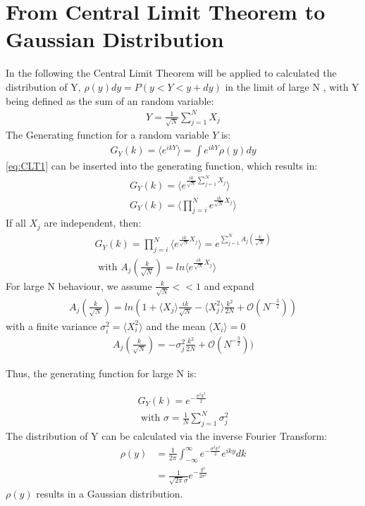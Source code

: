 \documentclass[
  a4paper,BCOR10mm,oneside,
  bibtotoc,idxtotoc,
  headsepline,footsepline,%
  fleqn,openbib
]{scrbook}
\begin{document}
\section{From Central Limit Theorem to Gaussian Distribution}\label{append:CLT}
In the following the Central Limit Theorem will be applied to calculated the distribution of Y,  $\rho(y)dy=P(y<Y<y+dy)$ in the limit of large N , with Y being defined as the sum of an random variable:
 \begin{align}
  Y = \frac{1}{\sqrt{N}} \sum_{j=1}^N X_j \label{eq:CLT1}
 \end{align}
The Generating function for a random variable $Y$ is: 
\begin{align}
 G_Y(k)=\langle e^{ikY}\rangle = \int e^{ikY} \rho(y)dy
\end{align}
\cref{eq:CLT1} can be inserted into the generating function, which results in:
\begin{align*}
G_Y(k)=\langle e^{\frac{ik}{\sqrt{N}} \sum_{j=1}^N X_j}\rangle \\
G_Y(k)=\langle \prod_{j=i}^N e^{\frac{ik}{\sqrt{N}} X_j} \rangle 
\end{align*}
If all $X_j$ are independent, then:
\begin{align}
 G_Y(k)= \prod_{j=i}^N \langle e^{\frac{ik}{\sqrt{N}} X_j} \rangle =e^{\sum_{j=1}^N A_j (\frac{k}{\sqrt{N}})} \\ \nonumber \text{ with } A_j(\frac{k}{\sqrt{N}})= ln \langle e^{\frac{ik}{\sqrt{N}} X_j} \rangle 
\end{align}
For large N behaviour, we assume $\frac{k}{\sqrt{N}} << 1$ and expand
\begin{align}
 A_j(\frac{k}{\sqrt{N}}) = ln(1+ \langle X_j \rangle \frac{ik}{\sqrt{N}} - \langle X_{j}^2 \rangle \frac{k^2}{2N}+\mathcal{O}(N^{- \frac{3}{2}}))
\end{align}
 with a finite variance $ \sigma_i^2=\langle X_{i}^2\rangle $ and the mean $\langle X_{i}\rangle = 0$
\begin{align}
 A_j(\frac{k}{\sqrt{N}}) = -\sigma_j^2 \frac{k^2}{2N}+\mathcal{O}(N^{- \frac{3}{2}}))
\end{align}

Thus, the generating function for large N is:

\begin{align}
 G_Y(k)=e^{- \frac{\sigma^2 k^2}{2}} \\ \nonumber
 \text{ with } \sigma =  \frac{1}{N} \sum_{j=1}^N \sigma_j^2 
\end{align}
The distribution of Y can be calculated via the inverse Fourier Transform:
\begin{align}
 \rho(y) &=\frac{1}{2 \pi} \int_{-\infty}^{\infty} e^{- \frac{\sigma^2 k^2}{2}} e^{i k y} dk \\  
 &=\frac{1}{\sqrt{2 \pi} \sigma } e^{-\frac{y^2}{2 \sigma^2}}
\end{align}
$\rho(y)$ results in a Gaussian distribution.
\end{document}
